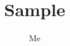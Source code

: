 \documentclass[a4paper,11pt]{article}
\title{Sample}
\author{Me}
\begin{document}
\maketitle
\tableofcontents

\incl
\end{document}
